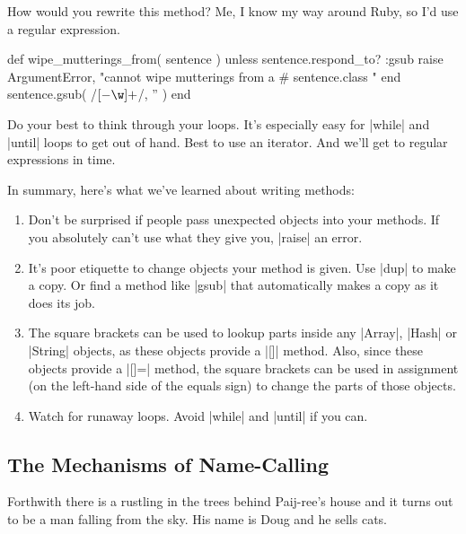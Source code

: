 \documentclass[12pt,twoside]{report}
\begin{document}
How would you rewrite this method?  Me, I know my way around Ruby, so
I'd use a regular expression.


\begin{rubycode}

 def wipe_mutterings_from( sentence )
   unless sentence.respond_to? :gsub
     raise ArgumentError,
       "cannot wipe mutterings from a #{ sentence.class }"
   end
   sentence.gsub( /\([-\w]+\)/, '' )
 end

\end{rubycode}


Do your best to think through your loops.  It's especially easy for
\rubyinline|while| and
\rubyinline|until| loops to get out of hand.  Best to
use an iterator.  And we'll get to regular expressions in time.

In summary, here's what we've learned about writing methods:

\begin{enumerate}
\item Don't be surprised if people pass unexpected objects into your
  methods. If you absolutely can't use what they give you,
  \rubyinline|raise| an error.
\item It's poor etiquette to change objects your method is given.  Use
  \rubyinline|dup| to make a copy.  Or find a method
  like \rubyinline|gsub| that automatically makes a
  copy as it does its job.
\item The square brackets can be used to lookup parts inside any
  \rubyinline|Array|,
  \rubyinline|Hash| or
  \rubyinline|String| objects, as these objects
  provide a \rubyinline|[]| method.  Also, since these
  objects provide a \rubyinline|[]=| method, the
  square brackets can be used in assignment (on the left-hand side of
  the equals sign) to change the parts of those objects.
\item Watch for runaway loops.  Avoid
  \rubyinline|while| and
  \rubyinline|until| if you can.
\end{enumerate}

\newpage



\subsection{The Mechanisms of Name-Calling}




Forthwith there is a rustling in the trees behind Paij-ree's house and
it turns out to be a man falling from the sky.  His name is Doug and
he sells cats.
\end{document}
